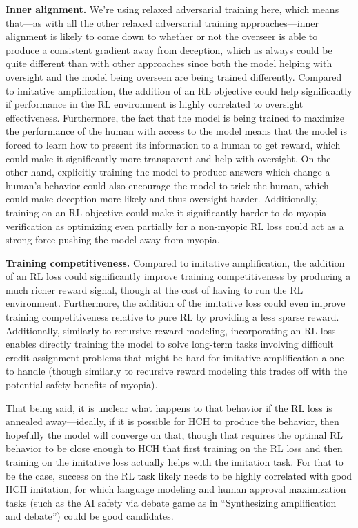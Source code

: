 \textbf{Inner alignment.} We're using relaxed adversarial training here, which means that---as with all the other relaxed adversarial training approaches---inner alignment is likely to come down to whether or not the overseer is able to produce a consistent gradient away from deception, which as always could be quite different than with other approaches since both the model helping with oversight and the model being overseen are being trained differently. Compared to imitative amplification, the addition of an RL objective could help significantly if performance in the RL environment is highly correlated to oversight effectiveness. Furthermore, the fact that the model is being trained to maximize the performance of the human with access to the model means that the model is forced to learn how to present its information to a human to get reward, which could make it significantly more transparent and help with oversight. On the other hand, explicitly training the model to produce answers which change a human's behavior could also encourage the model to trick the human, which could make deception more likely and thus oversight harder. Additionally, training on an RL objective could make it significantly harder to do myopia verification\cite{TODO: cite https://www.alignmentforum.org/posts/BKM8uQS6QdJPZLqCr/towards-a-mechanistic-understanding-of-corrigibility} as optimizing even partially for a non-myopic RL loss could act as a strong force pushing the model away from myopia.

\textbf{Training competitiveness.} Compared to imitative amplification, the addition of an RL loss could significantly improve training competitiveness by producing a much richer reward signal, though at the cost of having to run the RL environment. Furthermore, the addition of the imitative loss could even improve training competitiveness relative to pure RL by providing a less sparse reward. Additionally, similarly to recursive reward modeling, incorporating an RL loss enables directly training the model to solve long-term tasks involving difficult credit assignment problems that might be hard for imitative amplification alone to handle (though similarly to recursive reward modeling this trades off with the potential safety benefits of myopia).

That being said, it is unclear what happens to that behavior if the RL loss is annealed away---ideally, if it is possible for HCH to produce the behavior, then hopefully the model will converge on that, though that requires the optimal RL behavior to be close enough to HCH that first training on the RL loss and then training on the imitative loss actually helps with the imitation task. For that to be the case, success on the RL task likely needs to be highly correlated with good HCH imitation, for which language modeling and human approval maximization tasks (such as the AI safety via debate game as in ``Synthesizing amplification and debate\cite{TODO: cite https://www.alignmentforum.org/posts/dJSD5RK6Qoidb3QY5/synthesizing-amplification-and-debate}'') could be good candidates.

